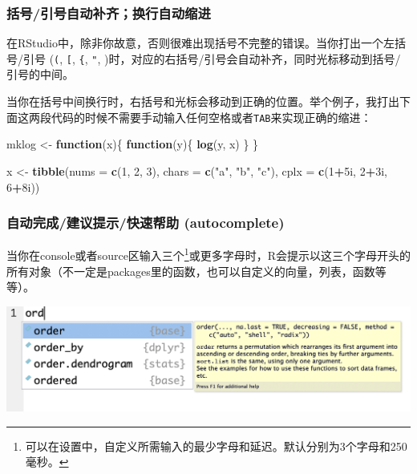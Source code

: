 \documentclass[]{book}
\newenvironment{Shaded}{\begin{snugshade}}{\end{snugshade}}
\newcommand{\ControlFlowTok}[1]{\textcolor[rgb]{0.13,0.29,0.53}{\textbf{#1}}}
\newcommand{\DataTypeTok}[1]{\textcolor[rgb]{0.13,0.29,0.53}{#1}}
\newcommand{\DecValTok}[1]{\textcolor[rgb]{0.00,0.00,0.81}{#1}}
\newcommand{\KeywordTok}[1]{\textcolor[rgb]{0.13,0.29,0.53}{\textbf{#1}}}
\newcommand{\NormalTok}[1]{#1}
\newcommand{\OperatorTok}[1]{\textcolor[rgb]{0.81,0.36,0.00}{\textbf{#1}}}
\newcommand{\StringTok}[1]{\textcolor[rgb]{0.31,0.60,0.02}{#1}}
\let\rmarkdownfootnote\footnote%
\def\footnote{\protect\rmarkdownfootnote}
\begin{document}
\subsubsection{括号/引号自动补齐；换行自动缩进}

在RStudio中，除非你故意，否则很难出现括号不完整的错误。当你打出一个左括号/引号 (\texttt{(}, \texttt{{[}}, \texttt{\{}, \texttt{"}, \texttt{\textquotesingle{}})时，对应的右括号/引号会自动补齐，同时光标移动到括号/引号的中间。

当你在括号中间换行时，右括号和光标会移动到正确的位置。举个例子，我打出下面这两段代码的时候不需要手动输入任何空格或者\texttt{TAB}来实现正确的缩进：

\begin{Shaded}
\begin{Highlighting}[]
\NormalTok{mklog <-}\StringTok{ }\ControlFlowTok{function}\NormalTok{(x)\{}
  \ControlFlowTok{function}\NormalTok{(y)\{}
    \KeywordTok{log}\NormalTok{(y, x)}
\NormalTok{  \}}
\NormalTok{\}}

\NormalTok{x <-}\StringTok{ }\KeywordTok{tibble}\NormalTok{(}\DataTypeTok{nums =} \KeywordTok{c}\NormalTok{(}\DecValTok{1}\NormalTok{, }\DecValTok{2}\NormalTok{, }\DecValTok{3}\NormalTok{),}
            \DataTypeTok{chars =} \KeywordTok{c}\NormalTok{(}\StringTok{"a"}\NormalTok{, }\StringTok{"b"}\NormalTok{, }\StringTok{"c"}\NormalTok{),}
            \DataTypeTok{cplx =} \KeywordTok{c}\NormalTok{(}\DecValTok{1}\OperatorTok{+}\NormalTok{5i, }\DecValTok{2}\OperatorTok{+}\NormalTok{3i, }\DecValTok{6}\OperatorTok{+}\NormalTok{8i))}
\end{Highlighting}
\end{Shaded}

\hypertarget{autocomplete}{%
\subsubsection{自动完成/建议提示/快速帮助 (autocomplete)}\label{autocomplete}}

当你在console或者source区输入三个\footnote{可以在设置中，自定义所需输入的最少字母和延迟。默认分别为3个字母和250毫秒。}或更多字母时，R会提示以这三个字母开头的所有对象（不一定是packages里的函数，也可以自定义的向量，列表，函数等等）。

\includegraphics[width=1\linewidth]{img/rstudio-fuli/auto}
\end{document}

